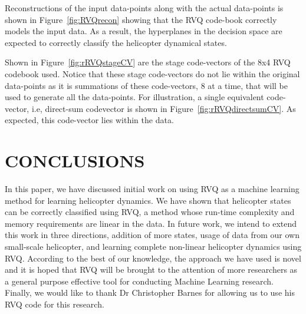 \documentclass{article}
\begin{document}
Reconstructions of the input data-points along with the actual data-points is shown in Figure~\ref{fig:RVQrecon} showing that the RVQ code-book correctly models the input data.  As a result, the hyperplanes in the decision space are expected to correctly classify the helicopter dynamical states.  

Shown in Figure~\ref{fig:rRVQstageCV} are the stage code-vectors of the 8x4 RVQ codebook used.  Notice that these stage code-vectors do not lie within the original data-points as it is summations of these code-vectors, 8 at a time, that will be used to generate all the data-points.  For illustration, a single equivalent code-vector, i.e, direct-sum codevector is shown in Figure~\ref{fig:rRVQdirectsumCV}.  As expected, this code-vector lies within the data.






 





\section{CONCLUSIONS}
In this paper, we have discussed initial work on using RVQ as a machine learning method for learning helicopter dynamics.  We have shown that helicopter states can be correctly classified using RVQ, a method whose run-time complexity and memory requirements are linear in the data.  In future work, we intend to extend this work in three directions, addition of more states, usage of data from our own small-scale helicopter, and learning complete non-linear helicopter dynamics using RVQ.  According to the best of our knowledge, the approach we have used is novel and it is hoped that RVQ will be brought to the attention of more researchers as a general purpose effective tool for conducting Machine Learning research.  Finally, we would like to thank Dr Christopher Barnes for allowing us to use his RVQ code for this research.



\end{document}
